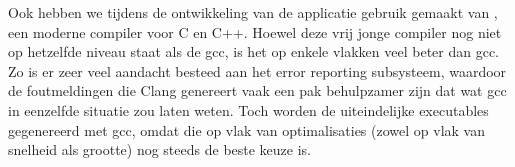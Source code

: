 Ook hebben we tijdens de ontwikkeling van de applicatie gebruik gemaakt van , een moderne compiler voor C en C++. Hoewel deze vrij jonge compiler nog niet op hetzelfde niveau staat als de \ac{gcc}, is het op enkele vlakken veel beter dan \ac{gcc}. Zo is er zeer veel aandacht besteed aan het error reporting subsysteem, waardoor de foutmeldingen die Clang genereert vaak een pak behulpzamer zijn dat wat \ac{gcc} in eenzelfde situatie zou laten weten. Toch worden de uiteindelijke executables gegenereerd met \ac{gcc}, omdat die op vlak van optimalisaties (zowel op vlak van snelheid als grootte) nog steeds de beste keuze is.

